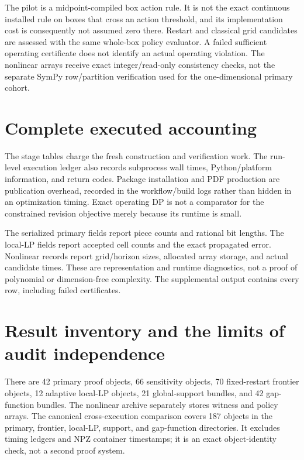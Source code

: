 The pilot is a midpoint-compiled box action rule. It is not the exact continuous installed rule on boxes that cross an action threshold, and its implementation cost is consequently not assumed zero there. Restart and classical grid candidates are assessed with the same whole-box policy evaluator. A failed sufficient operating certificate does not identify an actual operating violation. The nonlinear arrays receive exact integer/read-only consistency checks, not the separate SymPy row/partition verification used for the one-dimensional primary cohort.

\section{Complete executed accounting}


The stage tables charge the fresh construction and verification work. The run-level execution ledger also records subprocess wall times, Python/platform information, and return codes. Package installation and PDF production are publication overhead, recorded in the workflow/build logs rather than hidden in an optimization timing. Exact operating DP is not a comparator for the constrained revision objective merely because its runtime is small.

The serialized primary fields report piece counts and rational bit lengths. The local-LP fields report accepted cell counts and the exact propagated error. Nonlinear records report grid/horizon sizes, allocated array storage, and actual candidate times. These are representation and runtime diagnostics, not a proof of polynomial or dimension-free complexity. The supplemental output contains every row, including failed certificates.

\section{Result inventory and the limits of audit independence}
There are 42 primary proof objects, 66 sensitivity objects, 70 fixed-restart frontier objects, 12 adaptive local-LP objects, 21 global-support bundles, and 42 gap-function bundles. The nonlinear archive separately stores witness and policy arrays. The canonical cross-execution comparison covers 187 objects in the primary, frontier, local-LP, support, and gap-function directories. It excludes timing ledgers and NPZ container timestamps; it is an exact object-identity check, not a second proof system.

